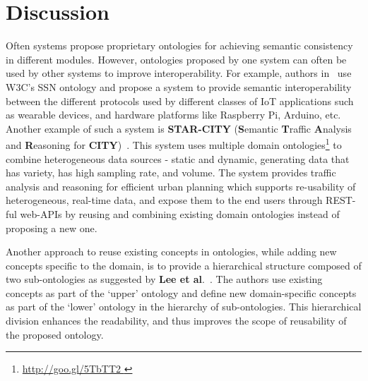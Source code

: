 \documentclass{elsart}  %
\begin{document}
\section{Discussion}\label{sec:discussion}
Often systems propose proprietary ontologies for achieving semantic consistency in different modules. However, ontologies proposed by one system can often be used by other systems to improve interoperability. For example, authors in~\cite{desai2015semantic} use W3C's SSN ontology and propose a system to provide semantic interoperability between the different protocols used by different classes of IoT applications such as wearable devices, and hardware platforms like Raspberry Pi, Arduino, etc. Another example of such a system is \textbf{STAR-CITY} (\textbf{S}emantic \textbf{T}raffic \textbf{A}nalysis and \textbf{R}easoning for \textbf{CITY})~\cite{lecue2014star}. This system uses multiple domain ontologies\footnote{\url{http://goo.gl/5TbTT2
}} to combine heterogeneous data sources - static and dynamic, generating data that has variety, has high sampling rate, and volume. The system provides traffic analysis and reasoning for efficient urban planning which supports re-usability of heterogeneous, real-time data, and expose them to the end users through REST-ful web-APIs by reusing and combining existing domain ontologies instead of proposing a new one.
\par 
Another approach to reuse existing concepts in ontologies, while adding new concepts specific to the domain, is to provide a hierarchical structure composed of two sub-ontologies as suggested by \textbf{Lee et al}.~\cite{lee2017location}. The authors use existing concepts as part of the `upper' ontology and define new domain-specific concepts as part of the `lower' ontology in the hierarchy of sub-ontologies. This hierarchical division enhances the readability, and thus improves the scope of reusability of the proposed ontology.
\par
\end{document}
